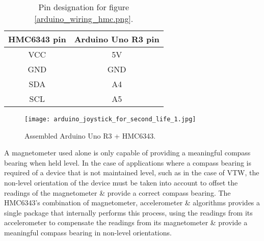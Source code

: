 
\begin{table}
\begin{center}
\begin{minipage}{.7\linewidth}
\begin{center}
\begin{tabular}{| c | c |}
\hline	
\textbf{HMC6343 pin} & \textbf{Arduino Uno R3 pin} \\
\hline
VCC & 5V\HMCvccFootnote{} \\
\hline
GND & GND \\
\hline
SDA & A4\itwocFootnote{} \\
\hline
SCL & A5 \\
\hline
\end{tabular}
\end{center}
\end{minipage}
\end{center}
\caption{Pin designation for figure \ref{arduino_wiring_hmc.png}.}
\label{HMC6343wiringtable}
\end{table}


\begin{figure}[h]
\centering
  \texttt{[image: arduino\_joystick\_for\_second\_life\_1.jpg]}
  \caption{Assembled Arduino Uno R3 + HMC6343.}
  \label{arduino_joystick_for_second_life_1.jpg}
\end{figure}

A magnetometer used alone is only capable of providing a meaningful compass bearing when held level. In the case of applications where a compass bearing is required of a device that is not maintained level, such as in the case of VTW, the non-level orientation of the device must be taken into account to offset the readings of the magnetometer \& provide a correct compass bearing. The HMC6343's combination of magnetometer, accelerometer \& algorithms provides a single package that internally performs this process, using the readings from its accelerometer to compensate the readings from its magnetometer \& provide a meaningful compass bearing in non-level orientations.

